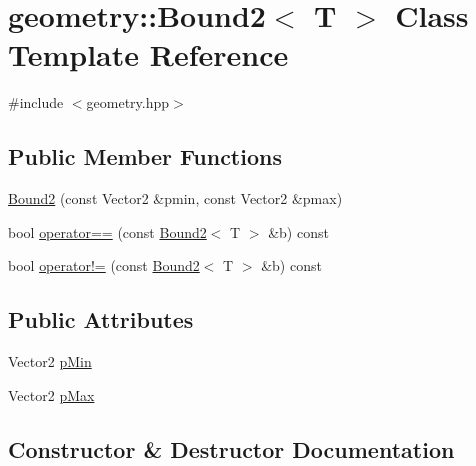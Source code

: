 \hypertarget{classgeometry_1_1Bound2}{}\section{geometry\+::Bound2$<$ T $>$ Class Template Reference}
\label{classgeometry_1_1Bound2}


{\ttfamily \#include $<$geometry.\+hpp$>$}

\subsection*{Public Member Functions}
\begin{DoxyCompactItemize}
\item 
\mbox{\hyperlink{classgeometry_1_1Bound2_a8357e22c9506fa12f53081866c4a116b}{Bound2}} (const Vector2 \&pmin, const Vector2 \&pmax)
\item 
bool \mbox{\hyperlink{classgeometry_1_1Bound2_af22badcc6691460b038d8e6ebbc09681}{operator==}} (const \mbox{\hyperlink{classgeometry_1_1Bound2}{Bound2}}$<$ T $>$ \&b) const
\item 
bool \mbox{\hyperlink{classgeometry_1_1Bound2_a8e78812595789edfd02d67d2ed229ccb}{operator!=}} (const \mbox{\hyperlink{classgeometry_1_1Bound2}{Bound2}}$<$ T $>$ \&b) const
\end{DoxyCompactItemize}
\subsection*{Public Attributes}
\begin{DoxyCompactItemize}
\item 
Vector2 \mbox{\hyperlink{classgeometry_1_1Bound2_a71331a33cc7e065884d711f2cd1ae46c}{p\+Min}}
\item 
Vector2 \mbox{\hyperlink{classgeometry_1_1Bound2_a3324d28687b4a243e81036dd2fc9cdae}{p\+Max}}
\end{DoxyCompactItemize}


\subsection{Constructor \& Destructor Documentation}
\mbox{\label{classgeometry_1_1Bound2_a8357e22c9506fa12f53081866c4a116b}} 
